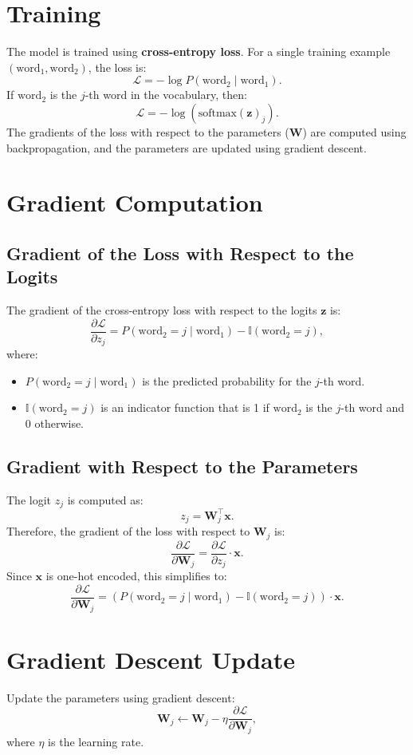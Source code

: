 \begin{notechapter}
\section{Training}
The model is trained using \textbf{cross-entropy loss}. For a single training
example \((\text{word}_1, \text{word}_2)\), the loss is:
\[
\mathcal{L} = -\log P(\text{word}_2 \mid \text{word}_1).
\]
If \(\text{word}_2\) is the \(j\)-th word in the vocabulary, then:
\[
\mathcal{L} = -\log \left( \text{softmax}(\mathbf{z})_j \right).
\]
The gradients of the loss with respect to the parameters (\(\mathbf{W}\)) are
computed using backpropagation, and the parameters are updated using gradient
descent.

\section{Gradient Computation}
\subsection{Gradient of the Loss with Respect to the Logits}
The gradient of the cross-entropy loss with respect to the logits \(\mathbf{z}\)
is:
\[
\frac{\partial \mathcal{L}}{\partial z_j} =
P(\text{word}_2 = j \mid \text{word}_1) - \mathbb{I}(\text{word}_2 = j),
\]
where:
\begin{itemize}
    \item \(P(\text{word}_2 = j \mid \text{word}_1)\) is the predicted
          probability for the \(j\)-th word.
    \item \(\mathbb{I}(\text{word}_2 = j)\) is an indicator function that is 1
          if \(\text{word}_2\) is the \(j\)-th word and 0 otherwise.
\end{itemize}

\subsection{Gradient with Respect to the Parameters}
The logit \(z_j\) is computed as:
\[
z_j = \mathbf{W}_j^\top \mathbf{x}.
\]
Therefore, the gradient of the loss with respect to \(\mathbf{W}_j\) is:
\[
\frac{\partial \mathcal{L}}{\partial \mathbf{W}_j} =
\frac{\partial \mathcal{L}}{\partial z_j} \cdot \mathbf{x}.
\]
Since \(\mathbf{x}\) is one-hot encoded, this simplifies to:
\[
\frac{\partial \mathcal{L}}{\partial \mathbf{W}_j} =
\left( P(\text{word}_2 = j \mid \text{word}_1) -
\mathbb{I}(\text{word}_2 = j) \right) \cdot \mathbf{x}.
\]

\section{Gradient Descent Update}
Update the parameters using gradient descent:
\[
\mathbf{W}_j \leftarrow \mathbf{W}_j - \eta \frac{\partial \mathcal{L}}{\partial \mathbf{W}_j},
\]
where \(\eta\) is the learning rate.


\end{notechapter}
